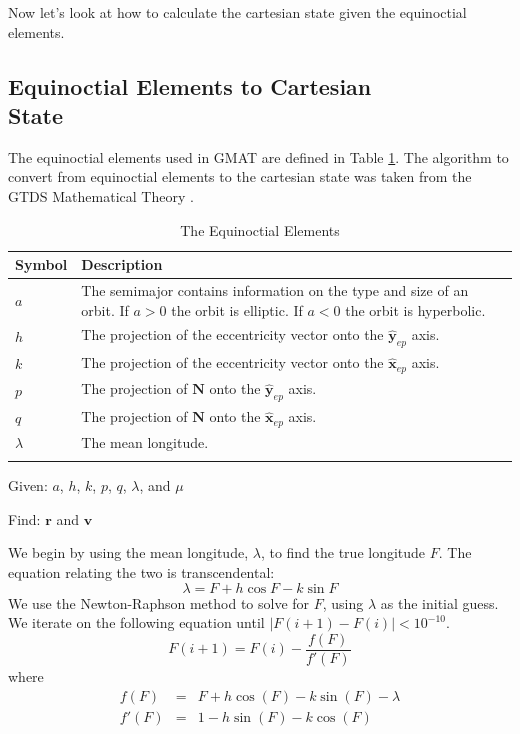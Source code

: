 Now let's look at how to calculate the cartesian state given the
equinoctial elements.

\subsection{Equinoctial Elements to Cartesian \\State}  
\label{Sec:EquinoctialtoCartesian}

The equinoctial elements used in GMAT are defined in Table
\ref{Table:EquinoctialElements}.  The algorithm to convert from
equinoctial elements to the cartesian state was taken from the
GTDS Mathematical Theory \cite{GTDS}.

\begin{table} \caption{The Equinoctial Elements}
\centering {}
\begin{tabular}{p{.5 in} p{5.0 in}}
  \hline\hline
   Symbol &  Description \\
  \hline
  $a$ &  The semimajor contains information on the type and size of an orbit.  If $a>0$ the orbit is elliptic.  If $a < 0$ the orbit is hyperbolic. \\
%
  $h$ &  The projection of the eccentricity vector onto the $\hat{\mathbf{y}}_{ep}$ axis. \\
  $k$ & The projection of the eccentricity vector onto the $\hat{\mathbf{x}}_{ep}$ axis. \\
  $p$ &  The projection of $\mathbf{N}$  onto the $\hat{\mathbf{y}}_{ep}$ axis.\\
  $q$ & The projection of $\mathbf{N}$  onto the $\hat{\mathbf{x}}_{ep}$ axis.  \\
  $\lambda$ & The mean longitude. \\
  \hline\hline \label{Table:EquinoctialElements}
\end{tabular}
\end{table}

\noindent Given: $a$, $h$, $k$, $p$, $q$, $\lambda$, and $\mu$

\noindent Find: $\mathbf{r}$ and $\mathbf{v}$

We begin by using the mean longitude, $\lambda$, to find the true
longitude $F$.  The equation relating the two is transcendental:
\begin{equation}
     \lambda = F + h\cos{F} - k \sin{F}
\end{equation}
%
We use the Newton-Raphson method to solve for $F$, using $\lambda$
as the initial guess.  We iterate on the following equation until
$|F(i+1) - F(i)| < 10^{-10}$.
%
\begin{equation}
    F(i+1) = F(i) - \frac{f(F)}{f'(F)}
\end{equation}
%
where
%
\begin{eqnarray}
    f(F) &=& F + h \cos(F) - k\sin(F) - \lambda \\
    f'(F) &=& 1 - h \sin(F) - k \cos(F)
\end{eqnarray}

